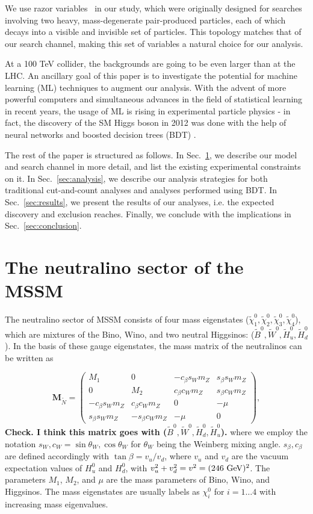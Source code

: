 \documentclass[a4paper,11pt]{article}
\newcommand{\Shufang}[1]{{\bf\color{Maroon}  #1}}
\renewcommand{\H}{\widetilde{H}^0}
\newcommand{\B}{\widetilde{B}^0}
\newcommand{\N}{\widetilde{\chi}^0}
\begin{document}
We use razor variables~\citep{Rogan:2010kb} in our study, which were originally designed
for searches involving two heavy, mass-degenerate pair-produced
particles, each of which decays into a visible and invisible set of
particles. This topology matches that of our search channel, making this
set of variables a natural choice for our analysis.  

At a 100 TeV collider, the backgrounds are going to be even larger than
at the LHC.  An ancillary goal of this paper is to investigate the
potential for machine learning (ML) techniques to augment our analysis.
With the advent of more powerful computers and simultaneous advances in
the field of statistical learning in recent years, the usage of ML is
rising in experimental particle physics - in fact, the discovery of the
SM Higgs boson in 2012 was done with the help of neural networks
\citep{Aad:2012tfa} and boosted decision trees (BDT)
\citep{Chatrchyan:2012xdj}.

The rest of the paper is structured as follows. In Sec.~\ref{sec:model}, we describe our model and search channel in more
detail, and list the existing experimental constraints on it. In Sec.~\ref{sec:analysis}, we describe our analysis strategies 
for both traditional cut-and-count analyses and analyses
performed using BDT. In Sec.~\ref{sec:results},
we present the results of our analyses, i.e. the expected discovery and exclusion
reaches. Finally, we conclude with the implications in Sec.~\ref{sec:conclusion}.

\section{The neutralino sector of the MSSM}
\label{sec:model}

 
The neutralino sector of MSSM consists of four mass eigenstates
($\N_1,\N_2,\N_3,\N_4$), which
are mixtures of the Bino, Wino, and two neutral Higgsinos: 
($\B,\widetilde{W}^0,\H_u,\H_d$). In the basis of these gauge eigenstates, the mass
matrix of the neutralinos can be written as

\newcommand{\cb}{ c_\beta}
\newcommand{\cw}{ c_W}
\newcommand{\sinb}{ s_\beta}
\newcommand{\sw}{ s_W}
\newcommand{\mz}{ m_Z}

\[\mathbf{M}_{\widetilde{N}}=
\begin{pmatrix}
  M_1 & 0 & -\cb\sw\mz & \sinb\sw\mz \\
  0 & M_2 & \cb\cw\mz & \sinb\cw\mz \\
  -\cb\sw\mz & \cb\cw\mz & 0 & -\mu \\
  \sinb\sw\mz & -\sinb\cw\mz & -\mu & 0
\end{pmatrix},\]
\Shufang{Check.  I think this matrix goes with ($\B,\widetilde{W}^0,\H_d,\H_u$).}
\noindent where we employ the notation $s_W, c_W = \sin\theta_W, \cos\theta_W$ for $\theta_W$ being the Weinberg mixing angle. $s_\beta, c_\beta$ are defined accordingly with $\tan\beta= v_u/v_d$, where $v_u$ and $v_d$ are the
vacuum expectation values of $H_u^0$ and $H_d^0$, with $v_u^2+v_d^2=v^2=(246\ {\rm GeV})^2$. The parameters $M_1$, $M_2$,
and $\mu$ are the mass parameters of Bino, Wino, and Higgsinos.  The mass eigenstates are usually labels as $\chi_i^0$ for $i=1 \ldots 4$ with increasing mass eigenvalues.
\end{document}
